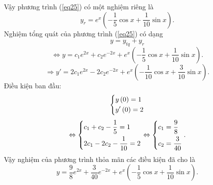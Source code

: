 \documentclass[12pt,a4paper]{article}
\begin{document}
Vậy phương trình (\ref{eq25}) có một nghiệm riêng là
\[{y_r} = {e^x}\left( { - \frac{1}{5}\cos x + \frac{1}{{10}}\sin x} \right).\]
Nghiệm tổng quát của phương trình (\ref{eq25}) có dạng
\[y = {y_{tq}} + {y_r}\]
\[ \Leftrightarrow y = {c_1}{e^{2x}} + {c_2}{e^{ - 2x}} + {e^x}\left( { - \frac{1}{5}\cos x + \frac{1}{{10}}\sin x} \right).\]
\[ \Rightarrow y' = 2{c_1}{e^{2x}} - 2{c_2}{e^{ - 2x}} + {e^x}\left( { - \frac{1}{{10}}\cos x + \frac{3}{{10}}\sin x} \right).\]
Điều kiện ban đầu:
\[\left\{ \begin{gathered}
  y\left( 0 \right) = 1 \hfill \\
  y'\left( 0 \right) = 2 \hfill \\ 
\end{gathered}  \right.\]
\[ \Leftrightarrow \left\{ \begin{gathered}
  {c_1} + {c_2} - \frac{1}{5} = 1 \hfill \\
  2{c_1} - 2{c_2} - \frac{1}{{10}} = 2 \hfill \\ 
\end{gathered}  \right. \Leftrightarrow \left\{ \begin{gathered}
  {c_1} = \frac{9}{8} \hfill \\
  {c_2} = \frac{3}{{40}} \hfill \\ 
\end{gathered}  \right..\]
Vậy nghiệm của phương trình thỏa mãn các điều kiện đã cho là
\[y = \frac{9}{8}{e^{2x}} + \frac{3}{{40}}{e^{ - 2x}} + {e^x}\left( { - \frac{1}{5}\cos x + \frac{1}{{10}}\sin x} \right).\]
\end{document}
